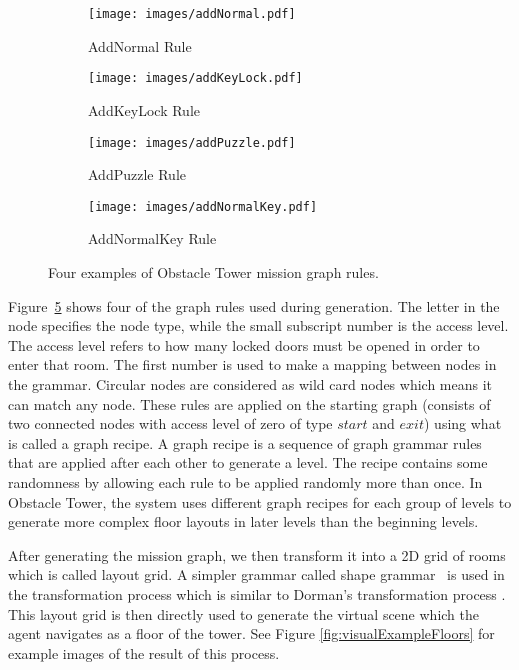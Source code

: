 \documentclass{article}
\begin{document}
\begin{figure}
    \begin{subfigure}[b]{0.4\linewidth}
        \centering
        \texttt{[image: images/addNormal.pdf]}
        \caption{AddNormal Rule}
        \label{fig:addNormal}
    \end{subfigure}
    \begin{subfigure}[b]{0.6\linewidth}
        \centering
        \texttt{[image: images/addKeyLock.pdf]}
        \caption{AddKeyLock Rule}
        \label{fig:addKeyLock}
    \end{subfigure}
    \begin{subfigure}[b]{0.45\linewidth}
        \centering
        \texttt{[image: images/addPuzzle.pdf]}
        \caption{AddPuzzle Rule}
        \label{fig:addPuzzle}
    \end{subfigure}
    \begin{subfigure}[b]{0.45\linewidth}
        \centering
        \texttt{[image: images/addNormalKey.pdf]}
        \caption{AddNormalKey Rule}
        \label{fig:addNormalKey}
    \end{subfigure}
\caption{Four examples of Obstacle Tower mission graph rules.}
    \label{fig:otGrammarRules}
\end{figure}

Figure~\ref{fig:otGrammarRules} shows four of the graph rules used during generation. The letter in the node specifies the node type, while the small subscript number is the access level. The access level refers to how many locked doors must be opened in order to enter that room. The first number is used to make a mapping between nodes in the grammar. Circular nodes are considered as wild card nodes which means it can match any node. These rules are applied on the starting graph (consists of two connected nodes with access level of zero of type $start$ and $exit$) using what is called a graph recipe. A graph recipe is a sequence of graph grammar rules that are applied after each other to generate a level. The recipe contains some randomness by allowing each rule to be applied randomly more than once. In Obstacle Tower, the system uses different graph recipes for each group of levels to generate more complex floor layouts in later levels than the beginning levels.



After generating the mission graph, we then transform it into a 2D grid of rooms which is called layout grid. A simpler grammar called shape grammar~\cite{stiny1971shape} is used in the transformation process which is similar to Dorman's transformation process \cite{dormans2010adventures}. This layout grid is then directly used to generate the virtual scene which the agent navigates as a floor of the tower. See Figure \ref{fig:visualExampleFloors} for example images of the result of this process. 
\end{document}
